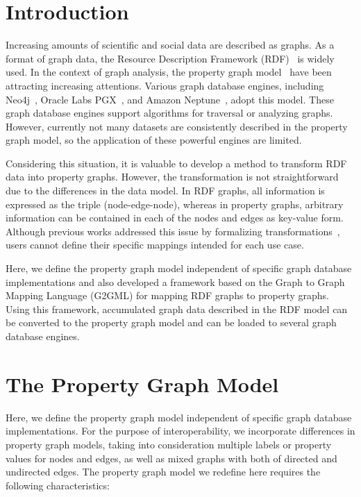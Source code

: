 \documentclass[runningheads]{llncs}
\begin{document}
\section{Introduction}

Increasing amounts of scientific and social data are described as graphs. As a format of graph data, the Resource Description Framework (RDF)~\cite{rdf} is widely used. 
In the context of graph analysis, the property graph model~\cite{angles1,angles} have been attracting increasing attentions. Various graph database engines, including Neo4j~\cite{neo4j}, Oracle Labs PGX~\cite{pgx}, and Amazon Neptune~\cite{neptune}, adopt this model. These graph database engines support algorithms for traversal or analyzing graphs. However, currently not many datasets are consistently described in the property graph model, so the application of these powerful engines are limited.

Considering this situation, it is valuable to develop a method to transform RDF data into property graphs. However, the transformation is not straightforward due to the differences in the data model. 
In RDF graphs, all information is expressed as the triple (node-edge-node), whereas in property graphs, arbitrary information can be contained in each of the nodes and edges as key-value form. 
Although previous works addressed this issue by formalizing transformations~\cite{hartig},
users cannot define their specific mappings intended for each use case.

Here, we define the property graph model independent of specific graph database implementations and also developed a framework based on the Graph to Graph Mapping Language (G2GML) for mapping RDF graphs to property graphs. Using this framework, accumulated graph data described in the RDF model can be converted to the property graph model and can be loaded to several graph database engines. 


\section{The Property Graph Model}
Here, we define the property graph model independent of specific graph database implementations. For the purpose of interoperability, we incorporate differences in property graph models, taking into consideration multiple labels or property values for nodes and edges, as well as mixed graphs with both of directed and undirected edges. The property graph model we redefine here requires the following characteristics:
\end{document}
